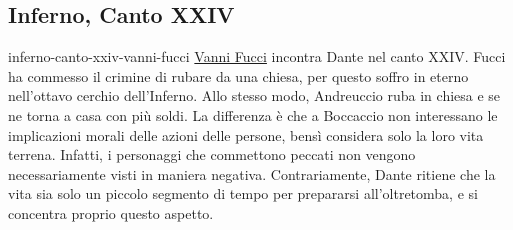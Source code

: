 \documentclass[preview]{standalone}
\begin{document}
\subsection{Inferno, Canto XXIV}

\begin{snippet}{inferno-canto-xxiv-vanni-fucci}
    \href{https://en.wikipedia.org/wiki/Vanni_Fucci}{Vanni Fucci}
    incontra Dante nel canto XXIV. Fucci ha commesso il crimine di
    rubare da una chiesa, per questo soffro in eterno nell'ottavo cerchio dell'Inferno.
    Allo stesso modo, Andreuccio ruba in chiesa e se ne torna a casa con più soldi.
    La differenza è che a Boccaccio non interessano le implicazioni morali delle azioni
    delle persone, bensì considera solo la loro vita terrena.
    Infatti, i personaggi che commettono peccati non vengono necessariamente visti
    in maniera negativa.
    Contrariamente, Dante ritiene che la vita sia solo un piccolo segmento di tempo
    per prepararsi all'oltretomba, e si concentra proprio questo aspetto.
\end{snippet}
\end{document}
